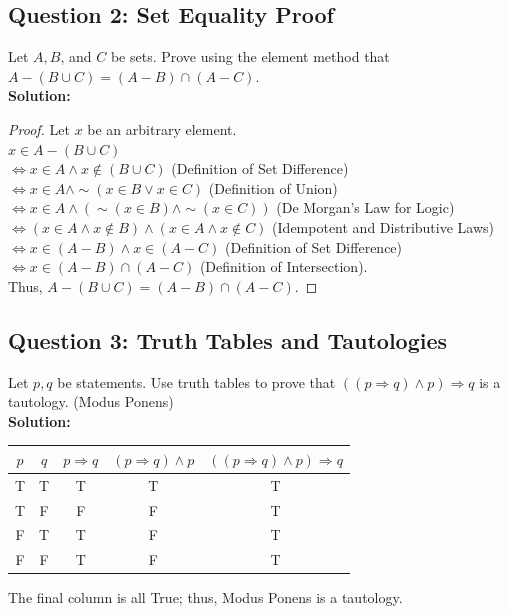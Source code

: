 \documentclass[11pt]{article}
\begin{document}
\subsection*{Question 2: Set Equality Proof}
Let $A, B$, and $C$ be sets. Prove using the element method that $A - (B \cup C) = (A - B) \cap (A - C)$.\\
\textbf{Solution:}
\begin{proof}
Let $x$ be an arbitrary element. \\
$x \in A - (B \cup C)$ \\
$\Leftrightarrow x \in A \wedge x \notin (B \cup C)$ (Definition of Set Difference) \\
$\Leftrightarrow x \in A \wedge \sim(x \in B \vee x \in C)$ (Definition of Union) \\
$\Leftrightarrow x \in A \wedge (\sim(x \in B) \wedge \sim(x \in C))$ (De Morgan's Law for Logic) \\
$\Leftrightarrow (x \in A \wedge x \notin B) \wedge (x \in A \wedge x \notin C)$ (Idempotent and Distributive Laws) \\
$\Leftrightarrow x \in (A - B) \wedge x \in (A - C)$ (Definition of Set Difference) \\
$\Leftrightarrow x \in (A - B) \cap (A - C)$ (Definition of Intersection). \\
Thus, $A - (B \cup C) = (A - B) \cap (A - C)$.
\end{proof}

\subsection*{Question 3: Truth Tables and Tautologies}
Let $p, q$ be statements. Use truth tables to prove that $((p \Rightarrow q) \wedge p) \Rightarrow q$ is a tautology. (Modus Ponens)\\
\textbf{Solution:}
\begin{center}
\begin{tabular}{|c|c|c|c|c|}
\hline
$p$ & $q$ & $p \Rightarrow q$ & $(p \Rightarrow q) \wedge p$ & $((p \Rightarrow q) \wedge p) \Rightarrow q$ \\
\hline
T & T & T & T & T \\
T & F & F & F & T \\
F & T & T & F & T \\
F & F & T & F & T \\
\hline
\end{tabular}
\end{center}
The final column is all True; thus, Modus Ponens is a tautology.
\end{document}

